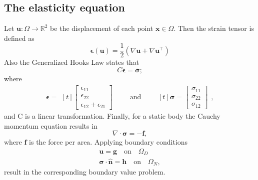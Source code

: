 \documentclass[11pt,a4paper,english]{elsarticle}%
\begin{document}
\subsection{The elasticity equation}
Let $\boldsymbol{u} : \Omega \rightarrow \mathbb{R}^2$ be the displacement of each point $\boldsymbol{x} \in \Omega$. Then the strain tensor is defined as 
\begin{equation} \label{eq-strain-tensor}
    \boldsymbol{\epsilon}(\boldsymbol{u}) = \frac{1}{2}(\nabla \boldsymbol{u} + \nabla \boldsymbol{u}^\intercal)
\end{equation}
Also the Generalized Hooks Law states that
\begin{equation}
    C \boldsymbol{\overline{\epsilon}}  = \boldsymbol{\overline{\sigma}};
    \label{hooks-law}
\end{equation}
where 
\begin{equation*}
    \boldsymbol{\overline{\epsilon}} =\begin{aligned}[t]
    \begin{bmatrix}
        \epsilon_{1 1} \\
        \epsilon_{2 2} \\
        \epsilon_{1 2} + \epsilon_{2 1}
    \end{bmatrix}
    \end{aligned}
    \qquad \text{and} \qquad
    \begin{aligned}[t]
        \boldsymbol{\overline{\sigma}} = \begin{bmatrix}
            \sigma_{1 1} \\
            \sigma_{2 2} \\
            \sigma_{1 2} 
        \end{bmatrix}
    \end{aligned},
\end{equation*}
and C is a linear transformation.
Finally, for a static body the Cauchy momentum equation results in 
\begin{equation} \label{eq-cauchy-momentum}
    \nabla \cdot \boldsymbol{\sigma} = -\boldsymbol{f},
\end{equation}
where $\boldsymbol{f}$ is the force per area. Applying boundary conditions 
\begin{align}
    \boldsymbol{u}  = \boldsymbol{g} \quad \text{on} \quad \Omega_D   \\
    \boldsymbol{\sigma} \cdot \boldsymbol{\hat{n}}  =  \boldsymbol{h} \quad \text{on} \quad \Omega_N,
    \label{elasticity-bc}
\end{align}
result in the corresponding boundary value problem. 
\end{document}
